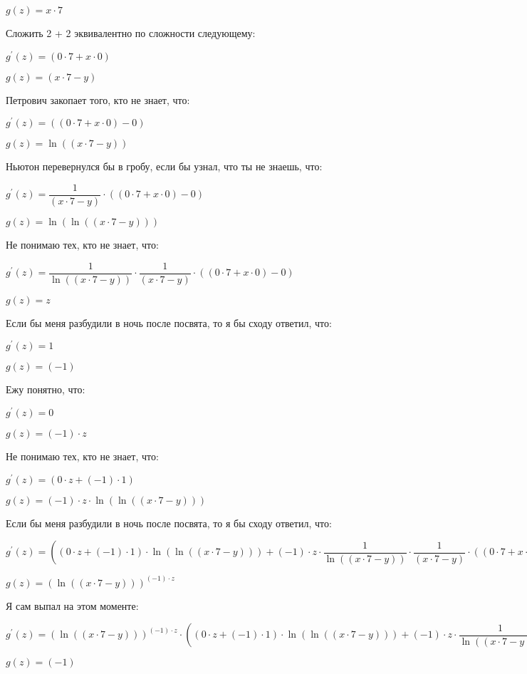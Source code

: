 \documentclass[a4paper,12pt]{article}
\begin{document}
\begin{flushleft}
$g(z) = x \cdot 7$

Сложить 2 + 2 эквивалентно по сложности следующему:

$g^{'}(z) = (0 \cdot 7+x \cdot 0)$

$g(z) = (x \cdot 7-y)$

Петрович закопает того, кто не знает, что:

$g^{'}(z) = ((0 \cdot 7+x \cdot 0)-0)$

$g(z) = \ln {((x \cdot 7-y))}$

Ньютон перевернулся бы в гробу, если бы узнал, что ты не знаешь, что:

$g^{'}(z) =  \dfrac{1}{(x \cdot 7-y)}  \cdot ((0 \cdot 7+x \cdot 0)-0)$

$g(z) = \ln {(\ln {((x \cdot 7-y))})}$

Не понимаю тех, кто не знает, что:

$g^{'}(z) =  \dfrac{1}{\ln {((x \cdot 7-y))}}  \cdot  \dfrac{1}{(x \cdot 7-y)}  \cdot ((0 \cdot 7+x \cdot 0)-0)$

$g(z) = z$

Если бы меня разбудили в ночь после посвята, то я бы сходу ответил, что:

$g^{'}(z) = 1$

$g(z) = (-1)$

Ежу понятно, что:

$g^{'}(z) = 0$

$g(z) = (-1) \cdot z$

Не понимаю тех, кто не знает, что:

$g^{'}(z) = (0 \cdot z+(-1) \cdot 1)$

$g(z) = (-1) \cdot z \cdot \ln {(\ln {((x \cdot 7-y))})}$

Если бы меня разбудили в ночь после посвята, то я бы сходу ответил, что:

$g^{'}(z) = ((0 \cdot z+(-1) \cdot 1) \cdot \ln {(\ln {((x \cdot 7-y))})}+(-1) \cdot z \cdot  \dfrac{1}{\ln {((x \cdot 7-y))}}  \cdot  \dfrac{1}{(x \cdot 7-y)}  \cdot ((0 \cdot 7+x \cdot 0)-0))$

$g(z) = (\ln {((x \cdot 7-y))})^{(-1) \cdot z}$

Я сам выпал на этом моменте:

$g^{'}(z) = (\ln {((x \cdot 7-y))})^{(-1) \cdot z} \cdot ((0 \cdot z+(-1) \cdot 1) \cdot \ln {(\ln {((x \cdot 7-y))})}+(-1) \cdot z \cdot  \dfrac{1}{\ln {((x \cdot 7-y))}}  \cdot  \dfrac{1}{(x \cdot 7-y)}  \cdot ((0 \cdot 7+x \cdot 0)-0))$

$g(z) = (-1)$


\end{flushleft}
\end{document}

